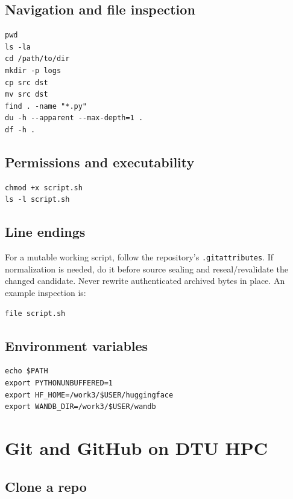 \documentclass[11pt,a4paper]{article}
\begin{document}
\subsection{Navigation and file inspection}

\begin{lstlisting}[style=shell]
pwd
ls -la
cd /path/to/dir
mkdir -p logs
cp src dst
mv src dst
find . -name "*.py"
du -h --apparent --max-depth=1 .
df -h .
\end{lstlisting}

\subsection{Permissions and executability}

\begin{lstlisting}[style=shell]
chmod +x script.sh
ls -l script.sh
\end{lstlisting}

\subsection{Line endings}

For a mutable working script, follow the repository's \texttt{.gitattributes}.
If normalization is needed, do it before source sealing and reseal/revalidate
the changed candidate. Never rewrite authenticated archived bytes in place.
An example inspection is:

\begin{lstlisting}[style=shell]
file script.sh
\end{lstlisting}

\subsection{Environment variables}

\begin{lstlisting}[style=shell]
echo $PATH
export PYTHONUNBUFFERED=1
export HF_HOME=/work3/$USER/huggingface
export WANDB_DIR=/work3/$USER/wandb
\end{lstlisting}

\section{Git and GitHub on DTU HPC}

\subsection{Clone a repo}
\end{document}
